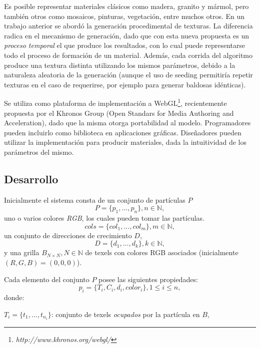 \documentclass[spanish,a4paper,11pt,oneside,links]{report}
\begin{document}
Es posible representar materiales cl\'asicos como madera, granito y m\'armol, pero tambi\'en otros como mosaicos, pinturas, vegetaci\'on, entre muchos otros. En un trabajo anterior \cite{Baravalle2010} se abord\'o la generaci\'on procedimental de texturas. La diferencia radica en el mecanismo de generaci\'on, dado que con esta nueva propuesta es un {\em proceso temporal} el que produce los resultados, con lo cual puede representarse todo el proceso de formaci\'on de un material. Adem\'as, cada corrida del algoritmo produce una textura distinta utilizando los mismos par\'ametros, debido a la naturaleza aleatoria de la generaci\'on (aunque el uso de seeding permitir\'ia repetir texturas en el caso de requerirse, por ejemplo para generar baldosas id\'enticas).

Se utiliza como plataforma de implementaci\'on a WebGL\footnote{\em http://www.khronos.org/webgl/}, recientemente propuesta por el Khronos Group (Open Standars for Media Authoring and Acceleration), dado que la misma otorga portabilidad al modelo. Programadores pueden incluirlo como biblioteca en aplicaciones gr\'aficas. Dise\~nadores pueden utilizar la implementaci\'on para producir materiales, dada la intuitividad de los par\'ametros del mismo.

\subsection{Desarrollo}
Inicialmente el sistema consta de un conjunto de part\'iculas $P$
\begin{equation}
P = \{p_{1}, ... , p_{n}\}, n  \in \mathbb{N},
\end{equation}
uno o varios colores {\em RGB}, los cuales pueden tomar las part\'iculas.
\begin{equation}
cols = \{col_{1}, ... , col_{m} \}, m \in \mathbb{N},
\end{equation}
un conjunto de direcciones de crecimiento $D$,
\begin{equation}
D = \{d_{1}, ... , d_{k} \}, k \in \mathbb{N},
\end{equation}
y una grilla $B_{N\times N}, N \in \mathbb{N} $ de texels con colores RGB asociados (inicialmente $(R,G,B)=(0,0,0)$).

Cada elemento del conjunto $P$ posee las siguientes propiedades:
\begin{equation}
p_{i} = \{T_{i}, C_{i}, d_{i}, color_{i}\}, 1 \le i \le n,
\end{equation}
donde:

$T_{i} = \{t_{1}, ... , t_{n_{i}}\}$: conjunto de texels {\em ocupados} por la part\'icula en $B$,
\end{document}
